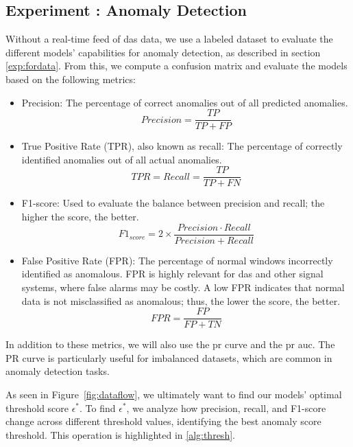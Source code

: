 \subsection{Experiment : Anomaly Detection}
Without a real-time feed of \acrshort{das} data, we use a labeled dataset to evaluate the different models' capabilities for anomaly detection, as described in section \ref{exp:fordata}. From this, we compute a confusion matrix and evaluate the models based on the following metrics:

\begin{itemize}
    \item Precision: The percentage of correct anomalies out of all predicted anomalies.
    \begin{equation}
        Precision = \frac{TP}{TP + FP}
    \end{equation}

    \item True Positive Rate (TPR), also known as recall: The percentage of correctly identified anomalies out of all actual anomalies.
    \begin{equation}
        TPR = Recall = \frac{TP}{TP + FN}
    \end{equation}

    \item F1-score: Used to evaluate the balance between precision and recall; the higher the score, the better. 
    \begin{equation}
        F1_{score} = 2 \times \frac{Precision \cdot Recall}{Precision + Recall}
    \end{equation}

    \item False Positive Rate (FPR): The percentage of normal windows incorrectly identified as anomalous. FPR is highly relevant for \acrshort{das} and other signal systems, where false alarms may be costly. A low FPR indicates that normal data is not misclassified as anomalous; thus, the lower the score, the better.
    \begin{equation}
        FPR = \frac{FP}{FP + TN}
    \end{equation}
\end{itemize}

In addition to these metrics, we will also use the \acrfull{pr} curve and the \acrshort{pr} \acrfull{auc}. The PR curve is particularly useful for imbalanced datasets, which are common in anomaly detection tasks.

As seen in Figure~\ref{fig:dataflow}, we ultimately want to find our models' optimal threshold score $\epsilon^*$. To find $\epsilon^*$, we analyze how precision, recall, and F1-score change across different threshold values, identifying the best anomaly score threshold. This operation is highlighted in \ref{alg:thresh}.  

